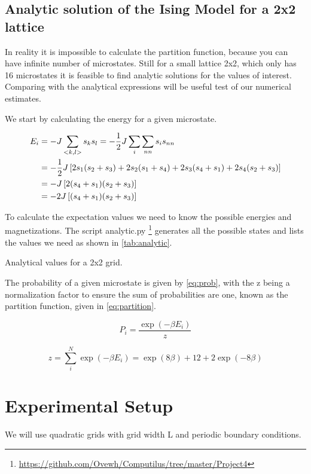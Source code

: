 \subsection{Analytic solution of the Ising Model for a 2x2 lattice}
In reality it is impossible to calculate the partition function, because you can
have infinite number of microstates. Still for a small lattice 2x2, which only
has 16 microstates it is
feasible to find analytic solutions for the values of
interest. Comparing with the analytical expressions will be useful test of our
numerical estimates.

We start by calculating the energy for a given microstate.

\begin{align*}
  E_i &= -J \sum_{<k,l>} s_k s_l = -\frac{1}{2}J \sum_{i} \sum_{nn} s_i s_{nn} \\
      &= -\frac{1}{2} J \left[2 s_1 (s_2 + s_3) + 2s_2(s_1 + s_4) + 2s_3(s_4 + s_1) + 2s_4 (s_2 + s_3)\right]\\
      &= -J\left[ 2(s_4 + s_1)(s_2 + s_3)\right] \\
      &= -2J\left[(s_4 + s_1)(s_2+s_3)\right]
\end{align*}

To calculate the expectation values we need to know the possible energies and
magnetizations. The script analytic.py \footnote{\url{https://github.com/Ovewh/Computilus/tree/master/Project4}}  generates all the
possible states and lists the values we need as shown in \cref{tab:analytic}.

\begin{table}[htp]
  \centering
  \caption{Analytical values for a 2x2 grid.}
  \label{tab:analytic}
\end{table}

The probability of a given microstate is given by \cref{eq:prob}, with
the z being a normalization factor to ensure the sum of probabilities are one,
known as the partition function, given in \cref{eq:partition}.


\begin{equation}
  \label{eq:prob}
  P_i = \frac{\exp(-\beta E_i)}{z}
\end{equation}

\begin{equation}
  \label{eq:partition}
  z = \sum_{i}^{N} \exp(-\beta E_i) = \exp(8\beta) + 12 + 2\exp(-8\beta)
\end{equation}


\section{Experimental Setup}
We will
use quadratic grids with grid width L and periodic
boundary conditions.


